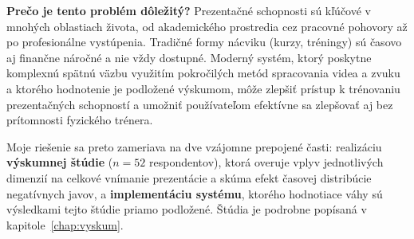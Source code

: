 \textbf{Prečo je tento problém dôležitý?} Prezentačné schopnosti sú kľúčové v mnohých oblastiach života, od akademického prostredia cez pracovné pohovory až po profesionálne vystúpenia. Tradičné formy nácviku (kurzy, tréningy) sú časovo aj finančne náročné a nie vždy dostupné. Moderný systém, ktorý poskytne komplexnú spätnú väzbu využitím pokročilých metód spracovania videa a zvuku a ktorého hodnotenie je podložené výskumom, môže zlepšiť prístup k trénovaniu prezentačných schopností a umožniť používateľom efektívne sa zlepšovať aj bez prítomnosti fyzického trénera.

Moje riešenie sa preto zameriava na dve vzájomne prepojené časti: realizáciu \textbf{výskumnej štúdie} ($n = 52$ respondentov), ktorá overuje vplyv jednotlivých dimenzií na celkové vnímanie prezentácie a skúma efekt časovej distribúcie negatívnych javov, a \textbf{implementáciu systému}, ktorého hodnotiace váhy sú výsledkami tejto štúdie priamo podložené. Štúdia je podrobne popísaná v kapitole~\ref{chap:vyskum}.